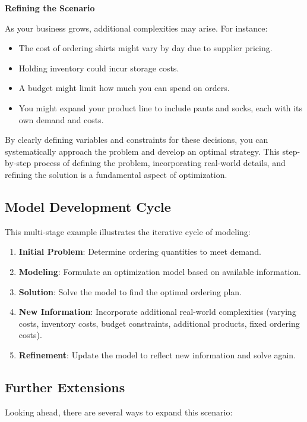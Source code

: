 \textbf{Refining the Scenario}

As your business grows, additional complexities may arise. For instance:
\begin{itemize}
    \item The cost of ordering shirts might vary by day due to supplier pricing.
    \item Holding inventory could incur storage costs.
    \item A budget might limit how much you can spend on orders.
    \item You might expand your product line to include pants and socks, each with its own demand and costs.
\end{itemize}

By clearly defining variables and constraints for these decisions, you can systematically approach the problem and develop an optimal strategy. This step-by-step process of defining the problem, incorporating real-world details, and refining the solution is a fundamental aspect of optimization.

\subsection*{Model Development Cycle}

This multi-stage example illustrates the iterative cycle of modeling:

\begin{enumerate}
    \item \textbf{Initial Problem}: Determine ordering quantities to meet demand.
    \item \textbf{Modeling}: Formulate an optimization model based on available information.
    \item \textbf{Solution}: Solve the model to find the optimal ordering plan.
    \item \textbf{New Information}: Incorporate additional real-world complexities (varying costs, inventory costs, budget constraints, additional products, fixed ordering costs).
    \item \textbf{Refinement}: Update the model to reflect new information and solve again.
\end{enumerate}

\subsection*{Further Extensions}

Looking ahead, there are several ways to expand this scenario:

